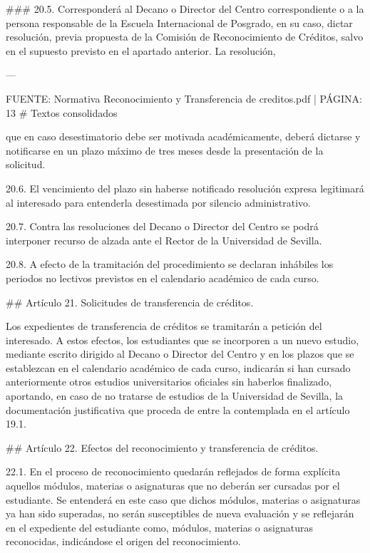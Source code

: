 \documentclass{article}
\begin{document}
\begin{itemize}
\begin{itemize}
\begin{scriptsize}
                  \#\#\# 20.5.
                  Corresponderá al Decano o Director del Centro correspondiente o a la persona responsable de la Escuela Internacional de Posgrado, en su caso, dictar resolución, previa propuesta de la Comisión de Reconocimiento de Créditos, salvo en el supuesto previsto en el apartado anterior. La resolución,

                  ---

                  FUENTE: Normativa Reconocimiento y Transferencia de creditos.pdf | PÁGINA: 13
                  \# Textos consolidados

                  que en caso desestimatorio debe ser motivada académicamente, deberá dictarse y notificarse en un plazo máximo de tres meses desde la presentación de la solicitud.

                  20.6. El vencimiento del plazo sin haberse notificado resolución expresa legitimará al interesado para entenderla desestimada por silencio administrativo.

                  20.7. Contra las resoluciones del Decano o Director del Centro se podrá interponer recurso de alzada ante el Rector de la Universidad de Sevilla.

                  20.8. A efecto de la tramitación del procedimiento se declaran inhábiles los periodos no lectivos previstos en el calendario académico de cada curso.

                  \#\# Artículo 21. Solicitudes de transferencia de créditos.

                  Los expedientes de transferencia de créditos se tramitarán a petición del interesado. A estos efectos, los estudiantes que se incorporen a un nuevo estudio, mediante escrito dirigido al Decano o Director del Centro y en los plazos que se establezcan en el calendario académico de cada curso, indicarán si han cursado anteriormente otros estudios universitarios oficiales sin haberlos finalizado, aportando, en caso de no tratarse de estudios de la Universidad de Sevilla, la documentación justificativa que proceda de entre la contemplada en el artículo 19.1.

                  \#\# Artículo 22. Efectos del reconocimiento y transferencia de créditos.

                  22.1. En el proceso de reconocimiento quedarán reflejados de forma explícita aquellos módulos, materias o asignaturas que no deberán ser cursadas por el estudiante. Se entenderá en este caso que dichos módulos, materias o asignaturas ya han sido superadas, no serán susceptibles de nueva evaluación y se reflejarán en el expediente del estudiante como, módulos, materias o asignaturas reconocidas, indicándose el origen del reconocimiento.


\end{scriptsize}
\end{itemize}
\end{itemize}
\end{document}
